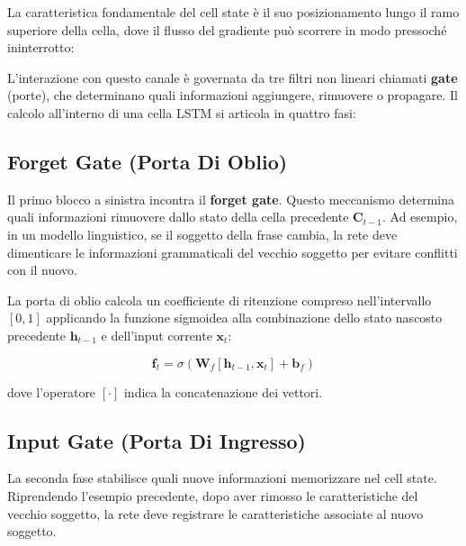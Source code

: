 ﻿\documentclass[11pt, a4paper]{article}
\begin{document}

La caratteristica fondamentale del cell state è il suo posizionamento lungo il ramo superiore della cella, dove il flusso del gradiente può scorrere in modo pressoché ininterrotto:


L'interazione con questo canale è governata da tre filtri non lineari chiamati \textbf{gate} (porte), che determinano quali informazioni aggiungere, rimuovere o propagare. Il calcolo all'interno di una cella LSTM si articola in quattro fasi:

\subsection{Forget Gate (Porta Di Oblio)}

Il primo blocco a sinistra incontra il \textbf{forget gate}. Questo meccanismo determina quali informazioni rimuovere dallo stato della cella precedente $\bm{C}_{t-1}$. Ad esempio, in un modello linguistico, se il soggetto della frase cambia, la rete deve dimenticare le informazioni grammaticali del vecchio soggetto per evitare conflitti con il nuovo.


La porta di oblio calcola un coefficiente di ritenzione compreso nell'intervallo $[0,1]$ applicando la funzione sigmoidea alla combinazione dello stato nascosto precedente $\bm{h}_{t-1}$ e dell'input corrente $\bm{x}_t$:

\begin{equation}
\boxed{\bm{f}_t = \sigma(\bm{W}_f [\bm{h}_{t-1}, \bm{x}_t] + \bm{b}_f)}
\end{equation}

dove l'operatore $[\cdot]$ indica la concatenazione dei vettori.

\subsection{Input Gate (Porta Di Ingresso)}

La seconda fase stabilisce quali nuove informazioni memorizzare nel cell state. Riprendendo l'esempio precedente, dopo aver rimosso le caratteristiche del vecchio soggetto, la rete deve registrare le caratteristiche associate al nuovo soggetto.
\end{document}

